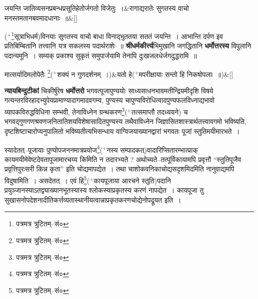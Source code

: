 \documentclass[article,12pt,a4paper]{memoir}
\newcommand{\add}[1]{($^{+}$#1)}
\begin{document}
	  \endgroup
	 
	    
	    \stanza[\smallbreak]
	जयन्ति जातिव्यसनप्रबन्धप्रसूतिहेतोर्जगतो विजेतुः ।&रागाद्यरातेः सुगतस्य वाचो मनस्तमतानबवमादधानाः ॥\&[\smallbreak]


	
	  \endgroup
	

	  \pstart \leavevmode{}\add{\footnote{पत्रमत्र त्रुटितम्--सं०}\-सूत्राभिधर्म}विनयाः सुगतस्य वाचो बाधा विनाद्भुततया सततं जयन्ति । आभान्ति दर्पण इव प्रतिबिम्बितानि तत्त्वानि यत्र सकलस्य पदार्थराशेः ॥ \textbf{श्रीधर्मकीर्त्त्य}भिमुखानि जगद्धितानि \textbf{धर्मोत्तरस्य} विपुलानि पदान्यमूनि । सम्यक् प्रकाश्य सुकृतं समुपार्जयामि तेनापि दुःखजलधेर्जगदुद्धरामि ॥
	\pend
      
	    
	    \stanza[\smallbreak]
	मात्सर्यादिमलोपेतैः \footnote{पत्रमत्र त्रुटितम्--सं०}\add{शक्यं न गुणदर्शनम् ।}&यतो हे\add{मपरीक्षायाः सन्तो हि निकषोपलाः ॥}\&[\smallbreak]


	

	  \pstart \textbf{न्यायबिन्दुटीकां} चिकीर्षुरेष \textbf{धर्मोत्तरो} भगवत्पूजापुण्ययोः साध्यसाधनभावमतीन्द्रियमीदृशि विषये गत्यन्तरविरहादभ्युपेयप्रामाण्यादागमादवगम्य, पुण्यस्य चापुण्यविरोधित्वादपुण्यफलविध्नाद्यभावो व्यापकविरुद्धविधिना सम्भवी, तेनाविध्नेन ग्रन्थकरण\footnote{पत्रमत्र त्रुटितम्--सं०}\add{तत्समाप्तौ  \leavevmode{} तदध्ययने} च भगवद्गुणगणश्रवणजनितातिशयविशेषासादितपुण्यस्य तथैवाविध्नेन जिज्ञासितशास्त्रार्थतत्त्वावगमो भविष्यति, दृष्टशिष्टाचारोप्यनुपालितो भविष्यतीत्यभिसन्धाय वाग्विजयाख्यानद्वारां भगवतः पूजां स्तुतिमयीमारभते ।
	\pend
      

	  \pstart स्यादेतत्--पूजायाः पुण्योपजननमात्रप्रयोज\footnote{पत्रमत्र त्रुटितम्--सं०}\add{नस्य सम्पादकत्}वादारिप्सितारम्भात्प्राक् कायमयीमेवेष्टदेवतापूजामारचय्य किमिति न तदारभ्यते ? अथोच्यते--तत्पूर्विकायामपि प्रवृत्तौ “स्तुतिपूजैव प्रवृत्तिपुरःसरी किन्न कृता” इति चोद्यमापद्येत । तथा चाशोकवनिकाचोद्यसदृशमिदमिति नानुवाद्यमपि विदुषामिति । असदेतत् । एवं हि\footnote{पत्रमत्र त्रुटितम्--सं०}\add{कायपूजाया आरचने स्तुति}पदानि प्रयुञ्जानस्याऽतद्व्याख्यानभूतस्यास्य श्लोकस्याप्रकृतस्य करणं नापद्येत । कायपूजा तु सुखासनोपदेशनादीतिकर्त्तव्यतास्थानीयत्वान्नाप्रकृतकरणचोद्येनोपद्रूयत इति ।
	\pend
      
\end{document}
